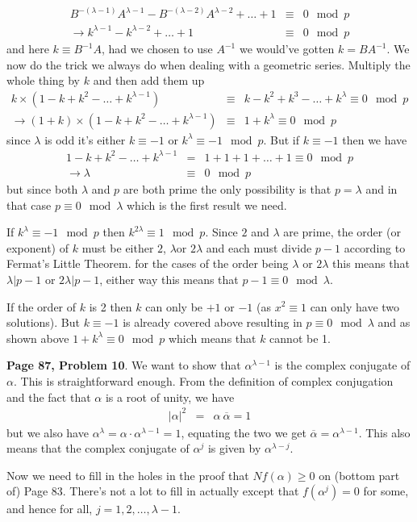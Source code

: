 \documentclass[aps,preprint,preprintnumbers,nofootinbib,showpacs,prd]{revtex4-1}
\newcommand{\nbea}{\begin{eqnarray*}}
\newcommand{\neea}{\end{eqnarray*}}
\begin{document}
%
\nbea
B^{-(\lambda - 1)}A^{\lambda-1} - B^{-(\lambda - 2)}A^{\lambda - 2}  + \dots + 1 & \equiv & 0 \mod{p} \\
\to k^{\lambda-1} - k^{\lambda - 2} +  \dots + 1 & \equiv & 0 \mod{p}
\neea
%
and here $k \equiv B^{-1}A$, had we chosen to use $A^{-1}$ we would've gotten $k = BA^{-1}$. We now do the trick we always do when dealing with a geometric series. Multiply the whole thing by $k$ and then add them up
%
\nbea
k \times (1 - k + k^2 - \dots + k^{\lambda - 1}) & \equiv & k - k^2 + k^3 - \dots + k^{\lambda} \equiv 0 \mod{p} \\
\to (1 + k) \times (1 - k + k^2 - \dots + k^{\lambda - 1})  & \equiv & 1 + k^{\lambda} \equiv 0 \mod{p}
\neea
%
since $\lambda$ is odd it's either $k \equiv -1$ or $k^{\lambda} \equiv -1 \mod{p}$. But if $k \equiv -1$ then we have
%
\nbea
1 - k + k^2 - \dots + k^{\lambda - 1} & = & 1 + 1 + 1 + \dots + 1 \equiv 0 \mod{p} \\
\to \lambda & \equiv & 0 \mod{p}
\neea
%
but since both $\lambda$ and $p$ are both prime the only possibility is that $p = \lambda$ and in that case $p \equiv 0 \mod{\lambda}$ which is the first result we need.

If $k^{\lambda} \equiv -1 \mod{p}$ then $k^{2\lambda} \equiv 1 \mod{p}$. Since $2$ and $\lambda$ are prime, the order (or exponent) of $k$ must be either $2$, $\lambda$or $2\lambda$ and each must divide $p - 1$ according to Fermat's Little Theorem. for the cases of the order being $\lambda$ or $2\lambda$ this means that $\lambda|p-1$ or $2\lambda|p-1$, either way this means that $p - 1 \equiv 0 \mod{\lambda}$.

If the order of $k$ is 2 then $k$ can only be $+1$ or $-1$ (as $x^2 \equiv 1$ can only have two solutions). But $k \equiv -1$ is already covered above resulting in $p \equiv 0 \mod{\lambda}$ and as shown above $1 + k^\lambda \equiv 0 \mod{p}$ which means that $k$ cannot be 1.

{\bf Page 87, Problem 10}. We want to show that $\alpha^{\lambda-1}$ is the complex conjugate of $\alpha$. This is straightforward enough. From the definition of complex conjugation and the fact that $\alpha$ is a root of unity, we have
%
\nbea
|\alpha|^2 & = & \alpha ~\overline{\alpha} = 1
\neea
%
but we also have $\alpha^{\lambda} = \alpha \cdot \alpha^{\lambda-1} = 1$, equating the two we get $\overline{\alpha} = \alpha^{\lambda-1}$. This also means that the complex conjugate of $\alpha^j$ is given by $\alpha^{\lambda-j}$.

Now we need to fill in the holes in the proof that $Nf(\alpha) \ge 0$ on (bottom part of) Page 83. There's not a lot to fill in actually except that $f(\alpha^j) = 0$ for some, and hence for all, $j = 1,2,\dots, \lambda-1$.
\end{document}
